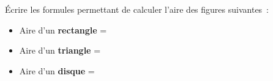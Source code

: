 \documentclass[exercice]{thedocument}%
\begin{document}
%
Écrire les formules permettant de calculer l'aire des figures suivantes~:\par
\begin{itemize}
    \item Aire d'un {\bfseries rectangle} = \doted{5cm}
    \item Aire d'un {\bfseries triangle} = \doted{5cm}
    \item Aire d'un {\bfseries disque} = \doted{5cm}
\end{itemize}
\end{document}
